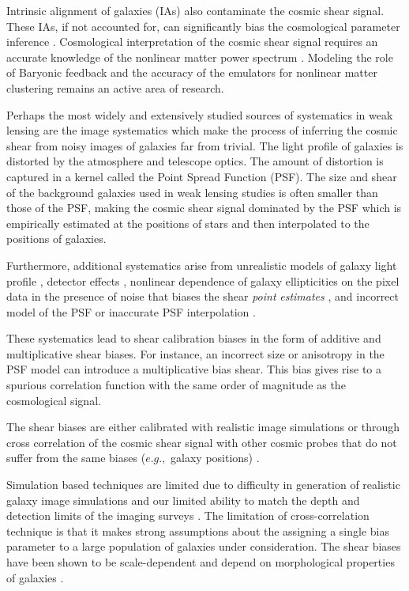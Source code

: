 Intrinsic alignment of galaxies (IAs) also contaminate the cosmic shear signal. These IAs, if not accounted for, 
can significantly bias the cosmological parameter inference \citep{codis2015,joachimi2015, kirk2015,krause_ia}. 
Cosmological interpretation of the cosmic shear signal requires an accurate knowledge of the nonlinear 
matter power spectrum \citep{semboloni2013, eifler2015, schaye2015, joudaki2016, kitching2016, mead2016}. Modeling the role of 
Baryonic feedback and the accuracy of the emulators for nonlinear matter clustering remains an active area of research. 

Perhaps the most widely and extensively studied sources of systematics in weak lensing are the image systematics which make 
the process of inferring the cosmic shear from noisy images of galaxies far from trivial. The light profile of 
galaxies is distorted by the atmosphere and telescope optics. The amount of distortion is captured in a kernel called 
the Point Spread Function (PSF). The size and shear of the background galaxies used in weak lensing studies is often 
smaller than those of the PSF, making the cosmic shear signal dominated by the PSF which is empirically estimated at 
the positions of stars and then interpolated to the positions of galaxies.  

Furthermore, additional systematics arise from unrealistic models of galaxy light profile \citep{voight2010,im3shape,kac2014}, 
detector effects \citep{arun2016,jaya2016,plazas2016}, nonlinear dependence of galaxy ellipticities 
on the pixel data in the presence of noise that biases the shear \emph{point} \emph{estimates} \citep{melchoir,great3,conti2017}, 
and incorrect model of the PSF or inaccurate PSF interpolation \citep{rowe2010,kuijken2015,great3,des}.

These systematics lead to shear calibration biases in the form of additive and multiplicative 
shear biases. For instance, an incorrect size or anisotropy in the PSF model can introduce 
a multiplicative bias shear. This bias gives rise to a spurious correlation function with the 
same order of magnitude as the cosmological signal.

The shear biases are either calibrated with realistic image simulations \citep{im3shape,jee2016,conti2017} or through cross correlation of 
the cosmic shear signal with other cosmic probes that do not suffer from the same biases ($e.g.,$ galaxy positions)
\citep{liu2016,schaan,singh2017}. 

Simulation based techniques are limited due to difficulty in 
generation of realistic galaxy image simulations \citep{great3,lanus2017} and our limited ability to match the depth and detection limits of 
the imaging surveys \citep{hoekstra}. The limitation of cross-correlation technique is that it makes strong assumptions about the assigning a 
single bias parameter to a large population of galaxies under consideration. The shear biases have been shown to be scale-dependent \citep{des,jee2016} 
and depend on morphological properties of galaxies \citep{im3shape,conti2017}. 

